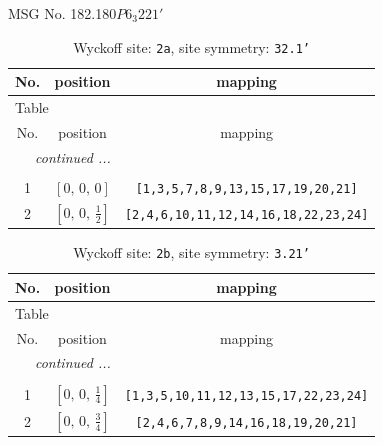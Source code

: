 \documentclass[fleqn,8pt]{jsarticle}
\begin{document}
\setcounter{MaxMatrixCols}{32}

\renewcommand{\tablename}{Table~}
\renewcommand{\figurename}{Figure~}
\begin{center}
\LARGE
MSG No. 182.180\quad$P6_{3}221'$
\end{center}
\renewcommand{\arraystretch}{1.2}
\begin{longtable}{ccc}
\caption{Wyckoff site: {\tt 2a}, site symmetry: {\tt 32.1'}}
 \\
 \hline \hline
No. & position & mapping \\ \hline \endfirsthead

\multicolumn{2}{l}{\tablename\ \thetable{}} \\
 \hline \hline
No. & position & mapping \\ \hline \endhead

 \hline \hline
\multicolumn{2}{r}{\footnotesize\it continued ...} \\ \endfoot

 \hline \hline
\multicolumn{2}{r}{} \\ \endlastfoot

1 & $\left[ 0,\, 0,\, 0 \right]$ & {\tt [1,3,5,7,8,9,13,15,17,19,20,21]} \\ \hline
2 & $\left[ 0,\, 0,\, \frac{1}{2} \right]$ & {\tt [2,4,6,10,11,12,14,16,18,22,23,24]} \\
\end{longtable}
\renewcommand{\arraystretch}{1.2}
\begin{longtable}{ccc}
\caption{Wyckoff site: {\tt 2b}, site symmetry: {\tt 3.21'}}
 \\
 \hline \hline
No. & position & mapping \\ \hline \endfirsthead

\multicolumn{2}{l}{\tablename\ \thetable{}} \\
 \hline \hline
No. & position & mapping \\ \hline \endhead

 \hline \hline
\multicolumn{2}{r}{\footnotesize\it continued ...} \\ \endfoot

 \hline \hline
\multicolumn{2}{r}{} \\ \endlastfoot

1 & $\left[ 0,\, 0,\, \frac{1}{4} \right]$ & {\tt [1,3,5,10,11,12,13,15,17,22,23,24]} \\ \hline
2 & $\left[ 0,\, 0,\, \frac{3}{4} \right]$ & {\tt [2,4,6,7,8,9,14,16,18,19,20,21]} \\
\end{longtable}
\end{document}
